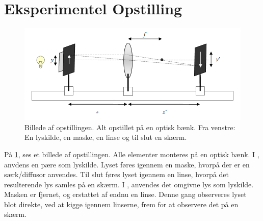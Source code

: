 \section{Eksperimentel Opstilling}
\begin{figure}[H]
    \includegraphics[width=\linewidth]{tegning.png}
    \caption{Billede af opstillingen. Alt opstillet på en optisk bænk. Fra venstre: En lyskilde, en maske, en linse  og til slut en skærm.}
    \label{fig:opstilling}
\end{figure}
På \cref{fig:opstilling}, ses et billede af opstillingen. Alle elementer monteres på en optisk bænk. I \forsogEt, anvdens en pære som lyskilde. Lyset føres igennem en maske, hvorpå der er en særk/diffusor anvendes. Til slut føres lyset igennem en linse, hvorpå det resulterende lys samles på en skærm. I \forsogTo, anvendes det omgivne lys som lyskilde. Masken er fjernet, og erstattet af endnu en linse. Denne gang observeres lyset blot direkte, ved at kigge igennem linserne, frem for at observere det på en skærm.
